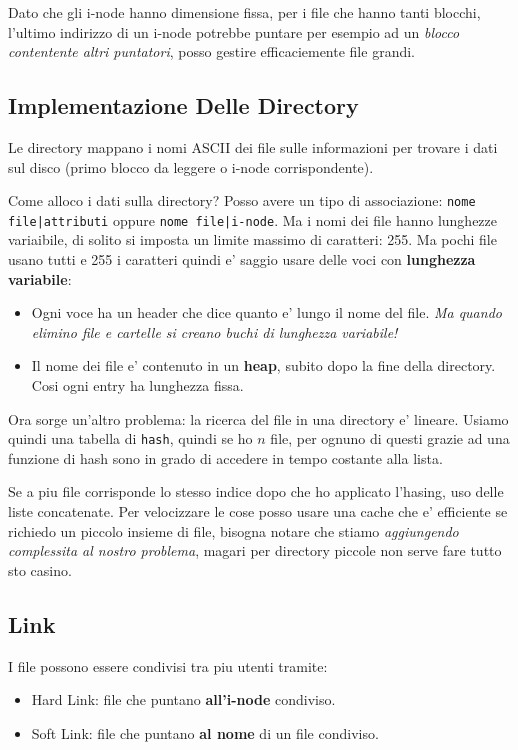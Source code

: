 Dato che gli i-node hanno dimensione fissa, per i file che hanno tanti blocchi, l'ultimo indirizzo di un i-node potrebbe
puntare per esempio ad un \textit{blocco contentente altri puntatori}, posso gestire efficaciemente file grandi. \\

\subsection{Implementazione Delle Directory}
Le directory mappano i nomi ASCII dei file sulle informazioni per trovare i dati sul disco (primo blocco da leggere o i-node corrispondente).

Come alloco i dati sulla directory? Posso avere un tipo di associazione: \texttt{nome file|attributi} oppure \texttt{nome file|i-node}.
Ma i nomi dei file hanno lunghezze variaibile, di solito si imposta un limite massimo di caratteri: 255. Ma pochi file usano tutti e 255 
i caratteri quindi e' saggio usare delle voci con \textbf{lunghezza variabile}:
\begin{itemize}
    \item Ogni voce ha un header che dice quanto e' lungo il nome del file. \textit{Ma quando elimino file e cartelle si creano buchi di lunghezza variabile!}
    \item Il nome dei file e' contenuto in un \textbf{heap}, subito dopo la fine della directory. Cosi ogni entry ha lunghezza fissa.
\end{itemize}

Ora sorge un'altro problema: la ricerca del file in una directory e' lineare. Usiamo quindi una
tabella di \texttt{hash}, quindi se ho $n$ file, per ognuno di questi grazie ad una funzione di hash
sono in grado di accedere in tempo costante alla lista.

Se a piu file corrisponde lo stesso indice dopo che ho applicato l'hasing, uso delle liste concatenate.
Per velocizzare le cose posso usare una cache che e' efficiente se richiedo un piccolo insieme di file, bisogna
notare che stiamo \textit{aggiungendo complessita al nostro problema}, magari per directory piccole non serve
fare tutto sto casino.

\subsection{Link}
I file possono essere condivisi tra piu utenti tramite:
\begin{itemize}
    \item Hard Link: file che puntano \textbf{all'i-node} condiviso.
    \item Soft Link: file che puntano \textbf{al nome} di un file condiviso.
\end{itemize}

